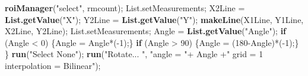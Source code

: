\documentclass[11pt,singlespacinge,twoside]{reedthesis} %
\newenvironment{Shaded}{}{}
\newcommand{\ControlFlowTok}[1]{\textbf{#1}}
\newcommand{\DecValTok}[1]{#1}
\newcommand{\KeywordTok}[1]{\textbf{#1}}
\newcommand{\NormalTok}[1]{#1}
\newcommand{\OperatorTok}[1]{#1}
\newcommand{\StringTok}[1]{#1}
\theoremstyle{definition}
\theoremstyle{definition}
\theoremstyle{definition}
\theoremstyle{remark}
\begin{document}
\begin{Shaded}
\begin{Highlighting}[numbers=left,,]
        \KeywordTok{roiManager}\NormalTok{(}\StringTok{"select"}\NormalTok{, rmcount);}
\NormalTok{        List.setMeasurements;}
\NormalTok{        X2Line =}\StringTok{ }\KeywordTok{List.getValue}\NormalTok{(}\StringTok{"X"}\NormalTok{);}
\NormalTok{        Y2Line =}\StringTok{ }\KeywordTok{List.getValue}\NormalTok{(}\StringTok{"Y"}\NormalTok{);}
        \KeywordTok{makeLine}\NormalTok{(X1Line, Y1Line, X2Line, Y2Line); }
\NormalTok{        List.setMeasurements;}
\NormalTok{        Angle =}\StringTok{ }\KeywordTok{List.getValue}\NormalTok{(}\StringTok{"Angle"}\NormalTok{);}
        \ControlFlowTok{if}\NormalTok{ (Angle }\OperatorTok{<}\StringTok{ }\DecValTok{0}\NormalTok{) \{Angle =}\StringTok{ }\NormalTok{Angle}\OperatorTok{*}\NormalTok{(}\OperatorTok{-}\DecValTok{1}\NormalTok{);\}}
        \ControlFlowTok{if}\NormalTok{ (Angle }\OperatorTok{>}\StringTok{ }\DecValTok{90}\NormalTok{) \{Angle =}\StringTok{ }\NormalTok{(}\DecValTok{180}\OperatorTok{-}\NormalTok{Angle)}\OperatorTok{*}\NormalTok{(}\OperatorTok{-}\DecValTok{1}\NormalTok{);\}}
\NormalTok{    \}}
    \KeywordTok{run}\NormalTok{(}\StringTok{"Select None"}\NormalTok{);}
    \KeywordTok{run}\NormalTok{(}\StringTok{"Rotate... "}\NormalTok{, }\StringTok{"angle = "}\OperatorTok{+}\StringTok{ }\NormalTok{Angle }\OperatorTok{+}\StringTok{" grid = 1 interpolation = Bilinear"}\NormalTok{);}
    

\end{Highlighting}
\end{Shaded}
\end{document}

